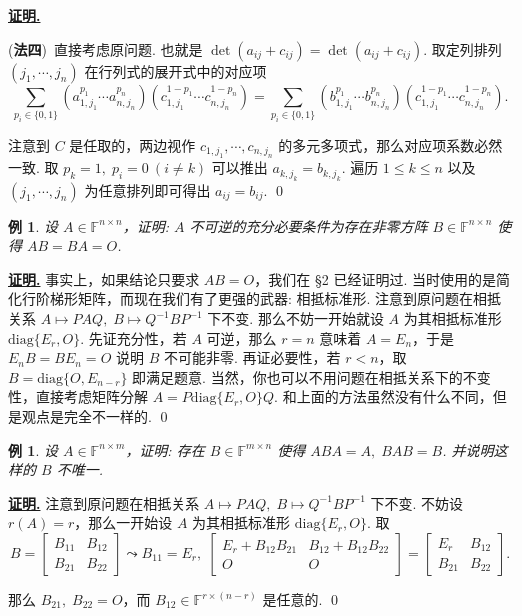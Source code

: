\documentclass[10pt,openany]{article}
\theoremstyle{thmstyle} %
\theoremstyle{defstyle} %
\theoremstyle{prostyle} %
\theoremstyle{exastyle}
\newtheorem{example}[theorem]{例}
\theoremstyle{remstyle}
\renewenvironment{proof}[1][证明]{\par\underline{\textbf{#1.}} \;\fangsong}{\qed\par}
\newcommand{\F}{\mathbb{F}}
\newcommand{\n}{^{n \times n}}
\newcommand{\mn}{^{m \times n}}
\newcommand{\nm}{^{n \times m}}
\newcommand{\diag}{\mathrm{diag}}
\begin{document}
\begin{proof}
	\vspace{1ex}
	
	(\textbf{法四})\ 直接考虑原问题. 也就是 \( \det(a_{ij}+c_{ij})=\det(a_{ij}+c_{ij}) \). 取定列排列 \( (j_1,\cdots,j_n) \) 在行列式的展开式中的对应项
	\[ \sum_{p_i \in \{0,1\}}^{} (a_{1,j_1}^{p_1}\cdots a_{n,j_n}^{p_n})(c_{1,j_1}^{1-p_1}\cdots c_{n,j_n}^{1-p_n})=\sum_{p_i \in \{0,1\}}^{} (b_{1,j_1}^{p_1}\cdots b_{n,j_n}^{p_n})(c_{1,j_1}^{1-p_1}\cdots c_{n,j_n}^{1-p_n}). \]
	
	注意到 \( C \) 是任取的，两边视作 \( c_{1,j_1},\cdots, c_{n,j_n} \) 的多元多项式，那么对应项系数必然一致. 取 \( p_k=1, \; p_i=0 \ (i \neq k) \) 可以推出 \( a_{k,j_k}=b_{k,j_k} \). 遍历 \( 1 \leq k \leq n \) 以及 \( (j_1,\cdots,j_n) \) 为任意排列即可得出 \( a_{ij}=b_{ij} \).
\end{proof}

\begin{example}
	设 \( A \in \F\n \)，证明: \( A \) 不可逆的充分必要条件为存在非零方阵 \( B \in \F\n \) 使得 \( AB=BA=O \).
\end{example}

\begin{proof}
	事实上，如果结论只要求 \( AB=O \)，我们在 \S 2 已经证明过. 当时使用的是简化行阶梯形矩阵，而现在我们有了更强的武器: 相抵标准形. 注意到原问题在相抵关系 \( A \mapsto PAQ, \; B \mapsto Q^{-1}BP^{-1} \) 下不变. 那么不妨一开始就设 \( A \) 为其相抵标准形 \( \diag\{E_r,O\} \). 先证充分性，若 \( A \) 可逆，那么 \( r=n \) 意味着 \( A=E_n \)，于是 \( E_nB=BE_n=O \) 说明 \( B \) 不可能非零. 再证必要性，若 \( r<n \)，取 \( B=\diag\{O,E_{n-r}\} \) 即满足题意.
	当然，你也可以不用问题在相抵关系下的不变性，直接考虑矩阵分解 \( A=P\diag\{E_r,O\} Q \). 和上面的方法虽然没有什么不同，但是观点是完全不一样的.
\end{proof}


\begin{example} \label{3.2.3}
	设 \( A \in \F\nm \)，证明: 存在 \( B \in \F\mn \) 使得 \( ABA=A, \; BAB=B \). 并说明这样的 \( B \) 不唯一.
\end{example}

\begin{proof}
	注意到原问题在相抵关系 \( A \mapsto PAQ, \; B \mapsto Q^{-1}BP^{-1} \) 下不变. 不妨设 \( r(A)=r \)，那么一开始设 \( A \) 为其相抵标准形 \( \diag\{E_r,O\} \). 取
	\[ B=\begin{bmatrix}
		B_{11} & B_{12} \\
		B_{21} & B_{22} 
	\end{bmatrix} \leadsto B_{11}=E_r, \; \begin{bmatrix}
	E_r+B_{12}B_{21} & B_{12}+B_{12}B_{22} \\
	O & O 
	\end{bmatrix}=\begin{bmatrix}
	E_r & B_{12} \\
	B_{21} & B_{22} 
	\end{bmatrix}. \]
	
	那么 \( B_{21}, \; B_{22}=O \)，而 \( B_{12} \in \F^{r \times (n-r)} \) 是任意的.
\end{proof}
\end{document}
